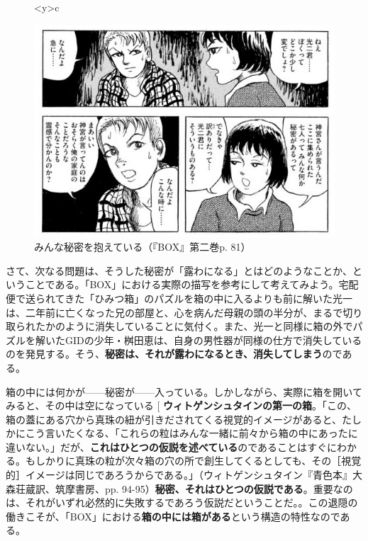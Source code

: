 \documentclass[9pt,b5j,twoside,twocolumn]{utarticle}
\makeatletter
\def\yakuchu{%
\@ifnextchar[\@xfootnote %
{\stepcounter{yakuchu}%
\protected@xdef\@thefnmark{\theyakuchu}%
\@footnotemark\@footnotetext}}
\makeatother
\begin{document}
\begin{figure}[h]
\begin{tabular}<y>{c}
\begin{minipage}[c]{0.71\hsize}
\centering
\includegraphics[scale=0.45]{秘密}
\caption{みんな秘密を抱えている（『BOX』第二巻p. 81）}
\end{minipage}
\end{tabular}
\end{figure}

さて、次なる問題は、そうした秘密が「露わになる」とはどのようなことか、ということである。「BOX」における実際の描写を参考にして考えてみよう。宅配便で送られてきた「ひみつ箱」のパズルを箱の中に入るよりも前に解いた光一は、二年前に亡くなった兄の部屋と、心を病んだ母親の頭の半分が、まるで切り取られたかのように消失していることに気付く。また、光一と同様に箱の外でパズルを解いたGIDの少年・桝田恵は、自身の男性器が同様の仕方で消失しているのを発見する。そう、\textbf{秘密は、それが露わになるとき、消失してしまう}のである。

箱の中には何かが------秘密が------入っている。しかしながら、実際に箱を開いてみると、その中は空になっている\yakuchu{\textbf{ウィトゲンシュタインの第一の箱}。「この、箱の蓋にある穴から真珠の紐が引きだされてくる視覚的イメージがあると、たしかにこう言いたくなる、「これらの粒はみんな一緒に前々から箱の中にあったに違いない。」だが、\textbf{これはひとつの仮説を述べている}のであることはすぐにわかる。もしかりに真珠の粒が次々箱の穴の所で創生してくるとしても、その［視覚的］イメージは同じであろうからである。」（ウィトゲンシュタイン『青色本』大森荘蔵訳、筑摩書房、pp. 94-95）\textbf{秘密、それはひとつの仮説である}。重要なのは、それがいずれ必然的に失敗するであろう仮説だということだ。}。この退隠の働きこそが、「BOX」における\textbf{箱の中には箱がある}という構造の特性なのである。
\end{document}
